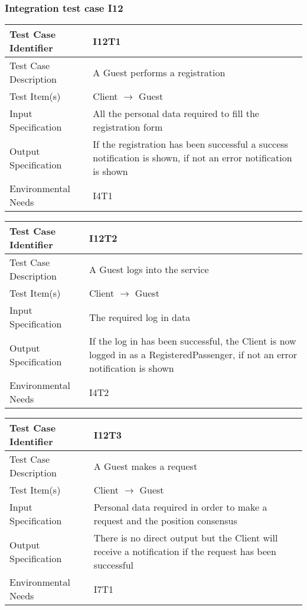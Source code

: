 		\subsubsection{Integration test case I12}
		\begin{center}
			\begin{tabular}{ |l p{10cm}| } \hline
				Test Case Identifier & I12T1 \\ \hline
				Test Case Description & A Guest performs a registration \\ \hline
				Test Item(s) & Client $\rightarrow$ Guest \\ \hline
				Input Specification & All the personal data required to fill the registration form \\ \hline
				Output Specification & If the registration has been successful a success notification is shown, if not an error
				notification is shown \\ \hline
				Environmental Needs & I4T1 \\ \hline
			\end{tabular}
		\end{center}
		\vspace{1cm}
		\begin{center}
			\begin{tabular}{ |l p{10cm}| } \hline
				Test Case Identifier & I12T2 \\ \hline
				Test Case Description & A Guest logs into the service \\ \hline
				Test Item(s) & Client $\rightarrow$ Guest \\ \hline
				Input Specification & The required log in data \\ \hline
				Output Specification & If the log in has been successful, the Client is now logged in as a RegisteredPassenger, if not
				an error notification is shown\\ \hline
				Environmental Needs & I4T2 \\ \hline
			\end{tabular}
		\end{center}
		\vspace{1cm}
		\begin{center}
			\begin{tabular}{ |l p{10cm}| } \hline
				Test Case Identifier & I12T3 \\ \hline
				Test Case Description & A Guest makes a request \\ \hline
				Test Item(s) & Client $\rightarrow$ Guest \\ \hline
				Input Specification & Personal data required in order to make a request and the position consensus \\ \hline
				Output Specification & There is no direct output but the Client will receive a notification if the request has been successful \\ \hline
				Environmental Needs & I7T1 \\ \hline
			\end{tabular}
		\end{center}
